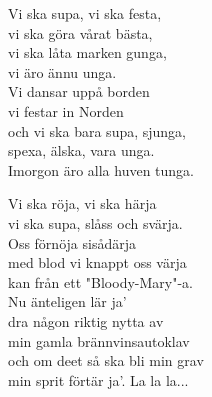 \documentclass[a6paper,10pt]{article}
\begin{document}
\setlength{\oddsidemargin}{-0.37in}
\begin{center}
\end{center}
\begin{lyrics}
Vi ska supa, vi ska festa,\\
vi ska göra vårat bästa,\\
vi ska låta marken gunga,\\
vi äro ännu unga.\\
Vi dansar uppå borden\\
vi festar in Norden\\
och vi ska bara supa, sjunga, \\
spexa, älska, vara unga.\\
Imorgon äro alla huven tunga.
\end{lyrics}
\begin{center}
\vspace{20pt}
\end{center}
\begin{lyrics}
Vi ska röja, vi ska härja\\
vi ska supa, slåss och svärja.\\
Oss förnöja sisådärja\\
med blod vi knappt oss värja\\
kan från ett "Bloody-Mary"-a.\\
Nu änteligen lär ja'\\
dra någon riktig nytta av\\
min gamla brännvinsautoklav\\
och om deet så ska bli min grav\\
min sprit förtär ja'.
\vspace{5pt}
La la la...
\end{lyrics}
\end{document}
